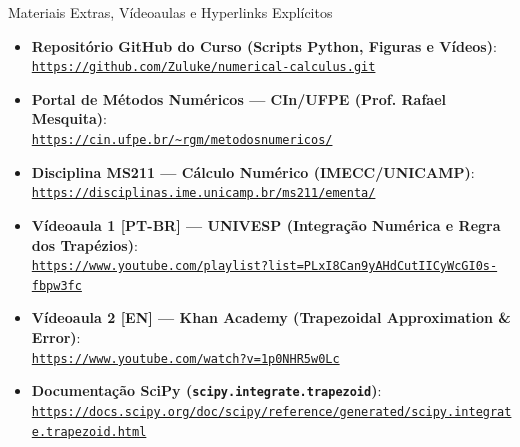 \documentclass[aspectratio=169]{beamer}
\newcommand{\code}[1]{\texttt{#1}}
\begin{document}
\begin{frame}{Materiais Extras, Vídeoaulas e Hyperlinks Explícitos}
\footnotesize
\begin{bee}
\begin{itemize}\scriptsize
    \item \textbf{Repositório GitHub do Curso (Scripts Python, Figuras e Vídeos)}: \\
    \href{https://github.com/Zuluke/numerical-calculus.git}{\nolinkurl{https://github.com/Zuluke/numerical-calculus.git}} \cite{cardoso2026_github}
    \item \textbf{Portal de Métodos Numéricos --- CIn/UFPE (Prof. Rafael Mesquita)}: \\
    \href{https://cin.ufpe.br/~rgm/metodosnumericos/}{\nolinkurl{https://cin.ufpe.br/~rgm/metodosnumericos/}} \cite{mesquita2026}
    \item \textbf{Disciplina MS211 --- Cálculo Numérico (IMECC/UNICAMP)}: \\
    \href{https://disciplinas.ime.unicamp.br/ms211/ementa/}{\nolinkurl{https://disciplinas.ime.unicamp.br/ms211/ementa/}} \cite{unicamp_ms211}
    \item \textbf{Vídeoaula 1 [PT-BR] --- UNIVESP (Integração Numérica e Regra dos Trapézios)}: \\
    \href{https://www.youtube.com/playlist?list=PLxI8Can9yAHdCutIICyWcGI0s-fbpw3fc}{\nolinkurl{https://www.youtube.com/playlist?list=PLxI8Can9yAHdCutIICyWcGI0s-fbpw3fc}} \cite{univesp_video}
    \item \textbf{Vídeoaula 2 [EN] --- Khan Academy (Trapezoidal Approximation \& Error)}: \\
    \href{https://www.youtube.com/watch?v=1p0NHR5w0Lc}{\nolinkurl{https://www.youtube.com/watch?v=1p0NHR5w0Lc}} \cite{khan_trapezoid_video}
    \item \textbf{Documentação SciPy (\code{scipy.integrate.trapezoid})}: \\
    \href{https://docs.scipy.org/doc/scipy/reference/generated/scipy.integrate.trapezoid.html}{\nolinkurl{https://docs.scipy.org/doc/scipy/reference/generated/scipy.integrate.trapezoid.html}} \cite{scipy_trapezoid}
\end{itemize}
\end{bee}
\end{frame}
\end{document}
